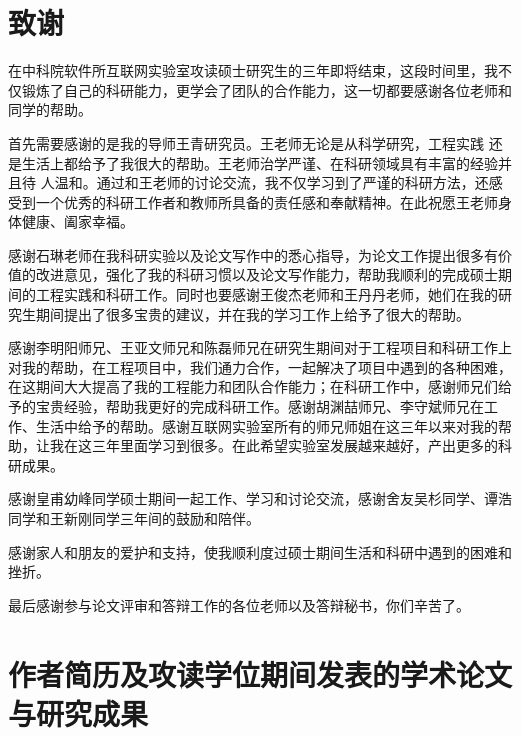 
\chapter[致谢]{致\quad 谢}%
\thispagestyle{noheaderstyle}%

在中科院软件所互联网实验室攻读硕士研究生的三年即将结束，这段时间里，我不仅锻炼了自己的科研能力，更学会了团队的合作能力，这一切都要感谢各位老师和同学的帮助。

首先需要感谢的是我的导师王青研究员。王老师无论是从科学研究，工程实践
还是生活上都给予了我很大的帮助。王老师治学严谨、在科研领域具有丰富的经验并且待
人温和。通过和王老师的讨论交流，我不仅学习到了严谨的科研方法，还感受到一个优秀的科研工作者和教师所具备的责任感和奉献精神。在此祝愿王老师身体健康、阖家幸福。

感谢石琳老师在我科研实验以及论文写作中的悉心指导，为论文工作提出很多有价值的改进意见，强化了我的科研习惯以及论文写作能力，帮助我顺利的完成硕士期间的工程实践和科研工作。同时也要感谢王俊杰老师和王丹丹老师，她们在我的研究生期间提出了很多宝贵的建议，并在我的学习工作上给予了很大的帮助。

感谢李明阳师兄、王亚文师兄和陈磊师兄在研究生期间对于工程项目和科研工作上对我的帮助，在工程项目中，我们通力合作，一起解决了项目中遇到的各种困难，在这期间大大提高了我的工程能力和团队合作能力；在科研工作中，感谢师兄们给予的宝贵经验，帮助我更好的完成科研工作。感谢胡渊喆师兄、李守斌师兄在工作、生活中给予的帮助。感谢互联网实验室所有的师兄师姐在这三年以来对我的帮助，让我在这三年里面学习到很多。在此希望实验室发展越来越好，产出更多的科研成果。

感谢皇甫幼峰同学硕士期间一起工作、学习和讨论交流，感谢舍友吴杉同学、谭浩同学和王新刚同学三年间的鼓励和陪伴。

感谢家人和朋友的爱护和支持，使我顺利度过硕士期间生活和科研中遇到的困难和挫折。

最后感谢参与论文评审和答辩工作的各位老师以及答辩秘书，你们辛苦了。


\chapter{作者简历及攻读学位期间发表的学术论文与研究成果}

